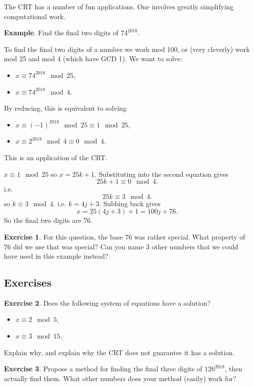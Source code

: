 \documentclass[11pt]{article}
\theoremstyle{definition}
\newtheorem{exercise}{Exercise}
\numberwithin{thm}{section}
\begin{document}
The CRT has a number of fun applications. One involves greatly simplifying computational work.

\textbf{Example}. Find the final two digits of $74^{2018}$.

To find the final two digits of a number we work mod 100, or (very cleverly) work mod 25 and mod 4 (which have GCD 1). We want to solve:
\begin{itemize}
	\item $x \equiv 74^{2018} \mod 25$,
    \item $x \equiv 74^{2018} \mod 4$.
\end{itemize}
By reducing, this is equivalent to solving
\begin{itemize}
	\item $x \equiv (-1)^{2018} \mod 25 \equiv 1 \mod 25$,
    \item $x \equiv 2^{2018} \mod 4 \equiv 0 \mod 4$.
\end{itemize}
This is an application of the CRT.

$x \equiv 1 \mod 25$ so $x = 25k + 1$. Substituting into the second equation gives
\[
	25k+1 \equiv 0 \mod 4.
\]
i.e.
\[
	25k \equiv 3 \mod 4.
\]
so $k\equiv 3 \mod 4$. i.e. $k = 4j+3$. Subbing back gives
\[
	x = 25(4j+3) + 1 = 100j + 76.
\]
So the final two digits are 76.

\begin{exercise} For this question, the base $76$ was rather special. What property of $76$ did we use that was special? Can you name 3 other numbers that we could have used in this example instead?
\end{exercise}

\subsection{Exercises}

\begin{exercise} Does the following system of equations have a solution?
\begin{itemize}
	\item $x \equiv 2 \mod 5$,
    \item $x \equiv 3 \mod 15$,
\end{itemize}
Explain why, and explain why the CRT does not guarantee it has a solution.
\end{exercise}

\begin{exercise} Propose a method for finding the final three digits of $126^{2018}$, then actually find them. What other numbers does your method (easily) work for?
\end{exercise}
\end{document}
